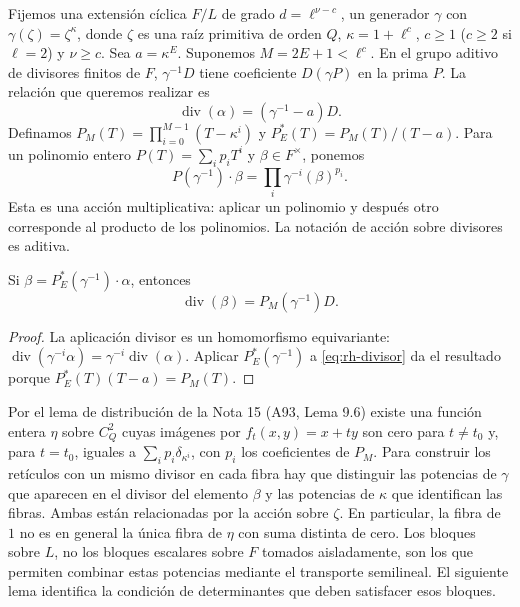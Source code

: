 Fijemos una extensión cíclica $F/L$ de grado $d=\ell^{\nu-c}$, un generador $\gamma$ con $\gamma(\zeta)=\zeta^\kappa$, donde $\zeta$ es una raíz primitiva de orden $Q$, $\kappa=1+\ell^c$, $c\ge1$ ($c\ge2$ si $\ell=2$) y $\nu\ge c$. Sea $a=\kappa^E$. Suponemos $M=2E+1<\ell^c$. En el grupo aditivo de divisores finitos de $F$, $\gamma^{-1}D$ tiene coeficiente $D(\gamma P)$ en la prima $P$. La relación que queremos realizar es
\begin{equation}
 \operatorname{div}(\alpha)=(\gamma^{-1}-a)D.
 \label{eq:rh-divisor}
\end{equation}
Definamos $P_M(T)=\prod_{i=0}^{M-1}(T-\kappa^i)$ y $P_E^*(T)=P_M(T)/(T-a)$. Para un polinomio entero $P(T)=\sum_i p_iT^i$ y $\beta\in F^\times$, ponemos
\[
 P(\gamma^{-1})\cdot\beta=\prod_i\gamma^{-i}(\beta)^{p_i}.
\]
Esta es una acción multiplicativa: aplicar un polinomio y después otro corresponde al producto de los polinomios. La notación de acción sobre divisores es aditiva.

\begin{lema}
\label{lem:rh-beta}
Si $\beta=P_E^*(\gamma^{-1})\cdot\alpha$, entonces
\begin{equation}
 \operatorname{div}(\beta)=P_M(\gamma^{-1})D.
 \label{eq:rh-beta-div}
\end{equation}
\end{lema}
\begin{proof}
La aplicación divisor es un homomorfismo equivariante: $\operatorname{div}(\gamma^{-i}\alpha)=\gamma^{-i}\operatorname{div}(\alpha)$. Aplicar $P_E^*(\gamma^{-1})$ a \eqref{eq:rh-divisor} da el resultado porque $P_E^*(T)(T-a)=P_M(T)$.
\end{proof}

Por el lema de distribución de la Nota 15 (A93, Lema 9.6) existe una función entera $\eta$ sobre $C_Q^2$ cuyas imágenes por $f_t(x,y)=x+ty$ son cero para $t\ne t_0$ y, para $t=t_0$, iguales a $\sum_i p_i\delta_{\kappa^i}$, con $p_i$ los coeficientes de $P_M$. Para construir los retículos con un mismo divisor en cada fibra hay que distinguir las potencias de $\gamma$ que aparecen en el divisor del elemento $\beta$ y las potencias de $\kappa$ que identifican las fibras. Ambas están relacionadas por la acción sobre $\zeta$. En particular, la fibra de $1$ no es en general la única fibra de $\eta$ con suma distinta de cero. Los bloques sobre $L$, no los bloques escalares sobre $F$ tomados aisladamente, son los que permiten combinar estas potencias mediante el transporte semilineal. El siguiente lema identifica la condición de determinantes que deben satisfacer esos bloques.

